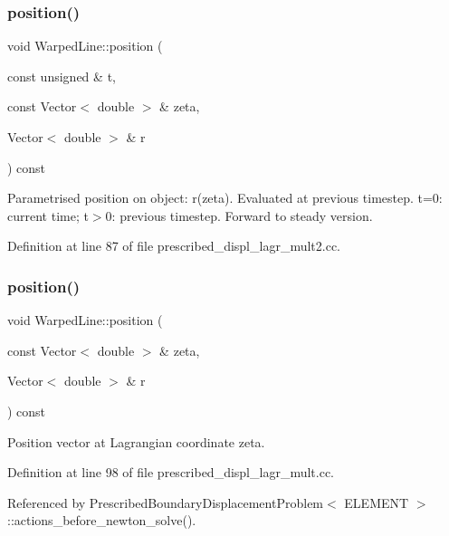 \subsubsection{\texorpdfstring{position()}{position()}\hspace{0.1cm}{\footnotesize\ttfamily [2/6]}}
{\footnotesize\ttfamily void Warped\+Line\+::position (\begin{DoxyParamCaption}\item[{const unsigned \&}]{t,  }\item[{const Vector$<$ double $>$ \&}]{zeta,  }\item[{Vector$<$ double $>$ \&}]{r }\end{DoxyParamCaption}) const\hspace{0.3cm}{\ttfamily [inline]}}



Parametrised position on object\+: r(zeta). Evaluated at previous timestep. t=0\+: current time; t$>$0\+: previous timestep. Forward to steady version. 



Definition at line 87 of file prescribed\+\_\+displ\+\_\+lagr\+\_\+mult2.\+cc.

\mbox{\label{classWarpedLine_aaeef89818148ee3a305c561e91c8851d}} 
\subsubsection{\texorpdfstring{position()}{position()}\hspace{0.1cm}{\footnotesize\ttfamily [3/6]}}
{\footnotesize\ttfamily void Warped\+Line\+::position (\begin{DoxyParamCaption}\item[{const Vector$<$ double $>$ \&}]{zeta,  }\item[{Vector$<$ double $>$ \&}]{r }\end{DoxyParamCaption}) const\hspace{0.3cm}{\ttfamily [inline]}}



Position vector at Lagrangian coordinate zeta. 



Definition at line 98 of file prescribed\+\_\+displ\+\_\+lagr\+\_\+mult.\+cc.



Referenced by Prescribed\+Boundary\+Displacement\+Problem$<$ E\+L\+E\+M\+E\+N\+T $>$\+::actions\+\_\+before\+\_\+newton\+\_\+solve().

